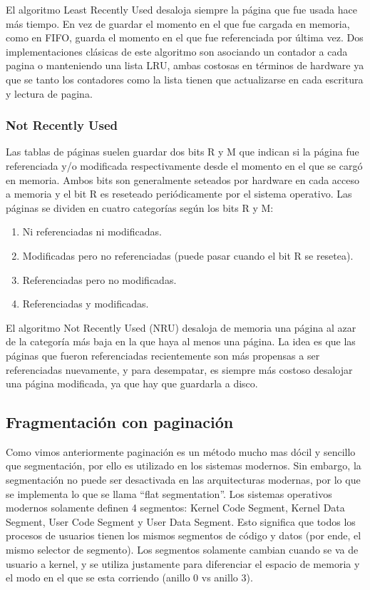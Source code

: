 \documentclass{article}
\begin{document}
El algoritmo Least Recently Used desaloja siempre la p\'agina que fue usada hace m\'as tiempo. En vez de guardar el momento en el que fue cargada en memoria, como en FIFO, guarda el momento en el que fue referenciada por \'ultima vez. Dos implementaciones clásicas de este algoritmo son asociando un contador a cada pagina o manteniendo una lista LRU, ambas costosas en términos de hardware ya que se tanto los contadores como la lista tienen que actualizarse en cada escritura y lectura de pagina.


\subsubsection{Not Recently Used}

Las tablas de p\'aginas suelen guardar dos bits R y M que indican si la p\'agina fue referenciada y/o modificada respectivamente desde el momento en el que se carg\'o en memoria. Ambos bits son generalmente seteados por hardware en cada acceso a memoria y el bit R es reseteado peri\'odicamente por el sistema operativo. Las p\'aginas se dividen en cuatro categor\'ias seg\'un los bits R y M:

\begin{enumerate}
\item Ni referenciadas ni modificadas.
\item Modificadas pero no referenciadas (puede pasar cuando el bit R se resetea).
\item Referenciadas pero no modificadas.
\item Referenciadas y modificadas.
\end{enumerate}

El algoritmo Not Recently Used (NRU) desaloja de memoria una p\'agina al azar de la categor\'ia m\'as baja en la que haya al menos una p\'agina. La idea es que las p\'aginas que fueron referenciadas recientemente son m\'as propensas a ser referenciadas nuevamente, y para desempatar, es siempre m\'as costoso desalojar una p\'agina modificada, ya que hay que guardarla a disco.

\subsection{Fragmentación con paginación}

Como vimos anteriormente paginación es un método mucho mas dócil y sencillo que segmentación, por ello es utilizado en los sistemas modernos. Sin embargo, la segmentación no puede ser desactivada en las arquitecturas modernas, por lo que se implementa lo que se llama ``flat segmentation''. Los sistemas operativos modernos solamente definen 4 segmentos: Kernel Code Segment, Kernel Data Segment, User Code Segment y User Data Segment. Esto significa que todos los procesos de usuarios tienen los mismos segmentos de código y datos (por ende, el mismo selector de segmento). Los segmentos solamente cambian cuando se va de usuario a kernel, y se utiliza justamente para diferenciar el espacio de memoria y el modo en el que se esta corriendo (anillo 0 vs anillo 3).
\end{document}
